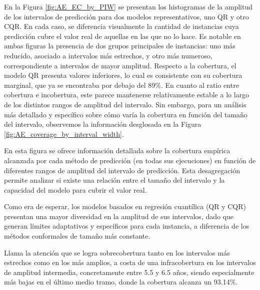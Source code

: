 En la Figura \ref{fig:AE_EC_by_PIW} se presentan los histogramas de la amplitud de los intervalos de predicción para dos modelos representativos, uno QR y otro CQR. En cada caso, se diferencia visualmente la cantidad de instancias cuya predicción cubre el valor real de aquellas en las que no lo hace. Es notable en ambas figuras la presencia de dos grupos principales de instancias: uno más reducido, asociado a intervalos más estrechos, y otro más numeroso, correspondiente a intervalos de mayor amplitud. Respecto a la cobertura, el modelo QR presenta valores inferiores, lo cual es consistente con su cobertura marginal, que ya se encontraba por debajo del 89\%. En cuanto al ratio entre cobertura e incobertura, este parece mantenerse relativamente estable a lo largo de los distintos rangos de amplitud del intervalo. Sin embargo, para un análisis más detallado y específico sobre cómo varía la cobertura en función del tamaño del intervalo, observemos la información desglosada en la Figura \ref{fig:AE_coverage_by_interval_width}.

En esta figura se ofrece información detallada sobre la cobertura empírica alcanzada por cada método de predicción (en todas sus ejecuciones) en función de diferentes rangos de amplitud del intervalo de predicción. Esta desagregación permite analizar si existe una relación entre el tamaño del intervalo y la capacidad del modelo para cubrir el valor real. 

Como era de esperar, los modelos basados en regresión cuantílica (QR y CQR) presentan una mayor diversidad en la amplitud de sus intervalos, dado que generan límites adaptativos y específicos para cada instancia, a diferencia de los métodos conformales de tamaño más constante.

Llama la atención que se logra sobrecobertura tanto en los intervalos más estrechos como en los más amplios, a costa de una infracobertura en los intervalos de amplitud intermedia, concretamente entre 5.5 y 6.5 años, siendo especialmente más bajas en el último medio tramo, donde la cobertura alcanza un 93.14\%.

